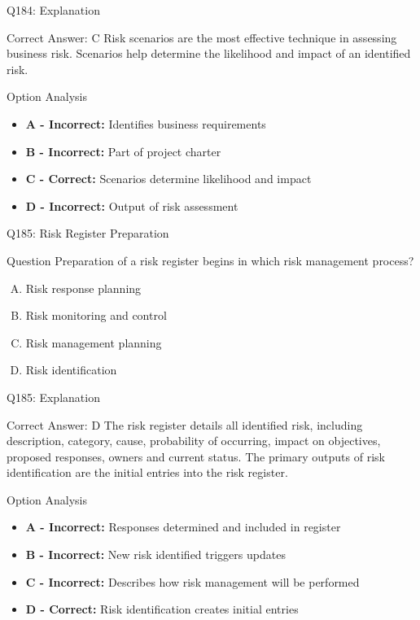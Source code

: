 \documentclass{beamer}
\begin{document}
	\begin{frame}{Q184: Explanation}
		\begin{block}{Correct Answer: C}
			Risk scenarios are the most effective technique in assessing business risk. Scenarios help determine the likelihood and impact of an identified risk.
		\end{block}
		\begin{block}{Option Analysis}
			\begin{itemize}
				\item \textbf{A - Incorrect:} Identifies business requirements
				\item \textbf{B - Incorrect:} Part of project charter
				\item \textbf{C - Correct:} Scenarios determine likelihood and impact
				\item \textbf{D - Incorrect:} Output of risk assessment
			\end{itemize}
		\end{block}
	\end{frame}
	
	\begin{frame}{Q185: Risk Register Preparation}
		\begin{block}{Question}
			Preparation of a risk register begins in which risk management process?
		\end{block}
		\begin{enumerate}[(A)]
			\item Risk response planning
			\item Risk monitoring and control
			\item Risk management planning
			\item Risk identification
		\end{enumerate}
	\end{frame}
	
	\begin{frame}{Q185: Explanation}
		\begin{block}{Correct Answer: D}
			The risk register details all identified risk, including description, category, cause, probability of occurring, impact on objectives, proposed responses, owners and current status. The primary outputs of risk identification are the initial entries into the risk register.
		\end{block}
		\begin{block}{Option Analysis}
			\begin{itemize}
				\item \textbf{A - Incorrect:} Responses determined and included in register
				\item \textbf{B - Incorrect:} New risk identified triggers updates
				\item \textbf{C - Incorrect:} Describes how risk management will be performed
				\item \textbf{D - Correct:} Risk identification creates initial entries
			\end{itemize}
		\end{block}
	\end{frame}
	
\end{document}
